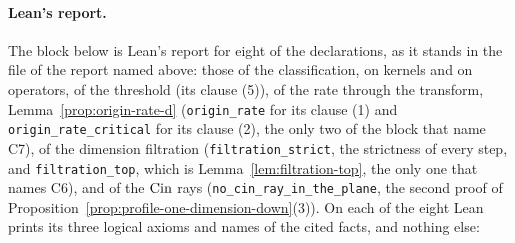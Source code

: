 \paragraph{Lean's report.} The block below is Lean's report for eight of the declarations, as it
stands in the file of the report named above: those of the classification, on kernels and on operators, of the threshold (its
clause (5)), of the rate through the transform, Lemma~\ref{prop:origin-rate-d}
(\texttt{origin\_rate} for its clause (1) and
\texttt{origin\_rate\_critical} for its clause (2), the only two of the block that name C7), of the
dimension filtration (\texttt{filtration\_strict}, the strictness of every step, and
\texttt{filtration\_top}, which is Lemma~\ref{lem:filtration-top}, the only one that names C6),
and of the $\operatorname{Cin}$ rays (\texttt{no\_cin\_ray\_in\_the\_plane}, the second proof of
Proposition~\ref{prop:profile-one-dimension-down}(3)). On each of the eight Lean prints its three
logical axioms and names of the cited facts, and nothing else:
\begingroup\makeatletter\def\verbatim@font{\normalfont\ttfamily\small}\makeatother

